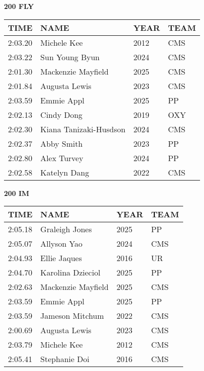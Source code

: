 \begin{table}[H]
\centering
\begin{minipage}[t]{0.48\textwidth}
\centering
\textbf{200 FLY}\\[0.1cm]
\begin{tabular}{@{}p{1.8cm}p{2.8cm}p{1.2cm}p{1.4cm}@{}}
\hline
    \textbf{TIME} & \textbf{NAME} & \textbf{YEAR} & \textbf{TEAM} \\
\hline
    2:03.20 & Michele Kee & 2012 & CMS \\
    2:03.22 & Sun Young Byun & 2024 & CMS \\
    2:01.30 & Mackenzie Mayfield & 2025 & CMS \\
    2:01.84 & Augusta Lewis & 2023 & CMS \\
    2:03.59 & Emmie Appl & 2025 & PP \\
    2:02.13 & Cindy Dong & 2019 & OXY \\
    2:02.30 & Kiana Tanizaki-Husdson & 2024 & CMS \\
    2:02.37 & Abby Smith & 2023 & PP \\
    2:02.80 & Alex Turvey & 2024 & PP \\
    2:02.58 & Katelyn Dang & 2022 & CMS \\
\hline
\end{tabular}
\end{minipage}\hfill
\begin{minipage}[t]{0.48\textwidth}
\centering
\textbf{200 IM}\\[0.1cm]
\begin{tabular}{@{}p{1.8cm}p{2.8cm}p{1.2cm}p{1.4cm}@{}}
\hline
    \textbf{TIME} & \textbf{NAME} & \textbf{YEAR} & \textbf{TEAM} \\
\hline
    2:05.18 & Graleigh Jones & 2025 & PP \\
    2:05.07 & Allyson Yao & 2024 & CMS \\
    2:04.93 & Ellie Jaques & 2016 & UR \\
    2:04.70 & Karolina Dzieciol & 2025 & PP \\
    2:02.63 & Mackenzie Mayfield & 2025 & CMS \\
    2:03.59 & Emmie Appl & 2025 & PP \\
    2:03.59 & Jameson Mitchum & 2022 & CMS \\
    2:00.69 & Augusta Lewis & 2023 & CMS \\
    2:03.79 & Michele Kee & 2012 & CMS \\
    2:05.41 & Stephanie Doi & 2016 & CMS \\
\hline
\end{tabular}
\end{minipage}
\end{table}

